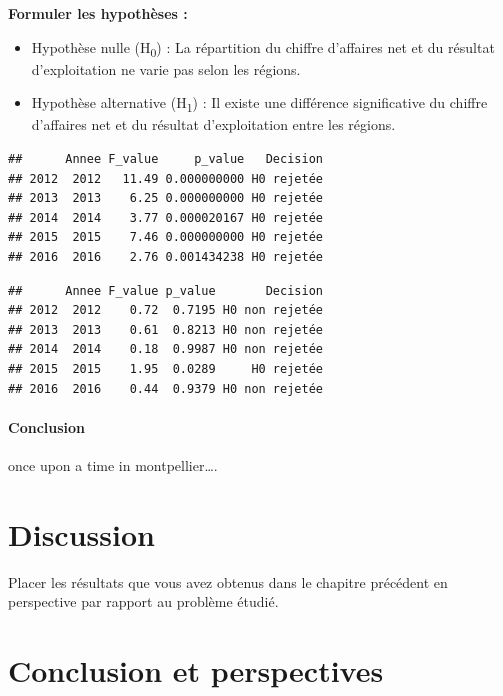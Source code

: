 \documentclass[mstat,12pt]{unswthesis}
\begin{document}
\medskip

\textbf{Formuler les hypothèses :}

\bigskip

\begin{itemize}
\tightlist
\item
  Hypothèse nulle (H\textsubscript{0}) : La répartition du chiffre
  d'affaires net et du résultat d'exploitation ne varie pas selon les
  régions. \medskip
\item
  Hypothèse alternative (H\textsubscript{1}) : Il existe une différence
  significative du chiffre d'affaires net et du résultat d'exploitation
  entre les régions.
\end{itemize}

\begin{verbatim}
##      Annee F_value     p_value   Decision
## 2012  2012   11.49 0.000000000 H0 rejetée
## 2013  2013    6.25 0.000000000 H0 rejetée
## 2014  2014    3.77 0.000020167 H0 rejetée
## 2015  2015    7.46 0.000000000 H0 rejetée
## 2016  2016    2.76 0.001434238 H0 rejetée
\end{verbatim}

\bigskip

\begin{verbatim}
##      Annee F_value p_value       Decision
## 2012  2012    0.72  0.7195 H0 non rejetée
## 2013  2013    0.61  0.8213 H0 non rejetée
## 2014  2014    0.18  0.9987 H0 non rejetée
## 2015  2015    1.95  0.0289     H0 rejetée
## 2016  2016    0.44  0.9379 H0 non rejetée
\end{verbatim}

\subsubsection{Conclusion}\label{conclusion-2}

once upon a time in montpellier\ldots.

\newpage

\chapter{Discussion}\label{discussion}

Placer les résultats que vous avez obtenus dans le chapitre précédent en
perspective par rapport au problème étudié.

\chapter{Conclusion et perspectives}\label{conclusion-et-perspectives}
\end{document}
